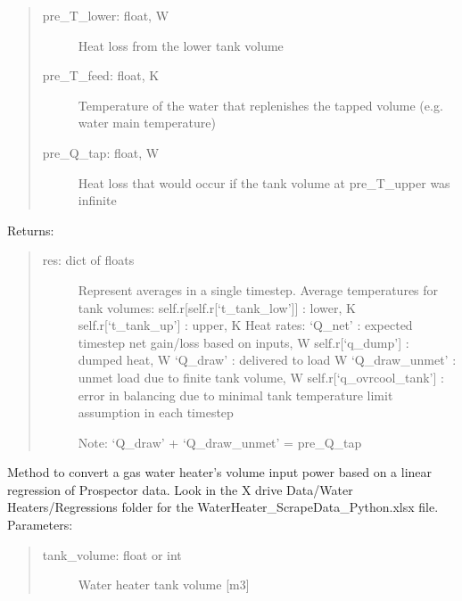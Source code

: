 \documentclass[letterpaper,10pt,english,openany]{sphinxmanual}
\begin{document}
\begin{fulllineitems}
\begin{fulllineitems}
\begin{quote}
\begin{description}
\item[{pre\_T\_lower: float, W}] \leavevmode
Heat loss from the lower tank volume

\item[{pre\_T\_feed: float, K}] \leavevmode
Temperature of the water
that replenishes the tapped volume
(e.g. water main temperature)

\item[{pre\_Q\_tap: float, W}] \leavevmode
Heat loss that would occur if the tank
volume at pre\_T\_upper was infinite

\end{description}
\end{quote}

Returns:
\begin{quote}
\begin{description}
\item[{res: dict of floats}] \leavevmode
Represent averages in a single timestep.
Average temperatures for tank volumes:
self.r{[}self.r{[}‘t\_tank\_low’{]}{]} : lower, K
self.r{[}‘t\_tank\_up’{]} : upper, K
Heat rates:
‘Q\_net’ : expected timestep net gain/loss based on inputs, W
self.r{[}‘q\_dump’{]} : dumped heat, W
‘Q\_draw’ : delivered to load W
‘Q\_draw\_unmet’ : unmet load due to finite tank volume, W
self.r{[}‘q\_ovrcool\_tank’{]} : error in balancing due to minimal
tank temperature limit assumption in each timestep

Note: ‘Q\_draw’ + ‘Q\_draw\_unmet’ = pre\_Q\_tap

\end{description}
\end{quote}

\end{fulllineitems}


\begin{fulllineitems}
\label{\detokenize{source/mswh.system:mswh.system.components.Storage.volume_to_power}}
Method to convert a gas water heater’s volume input power
based on a linear regression of Prospector data.
Look in the X drive Data/Water Heaters/Regressions folder
for the WaterHeater\_ScrapeData\_Python.xlsx file.
Parameters:
\begin{quote}
\begin{description}
\item[{tank\_volume: float or int}] \leavevmode
Water heater tank volume {[}m3{]}


\end{description}
\end{quote}
\end{fulllineitems}
\end{fulllineitems}
\end{document}
